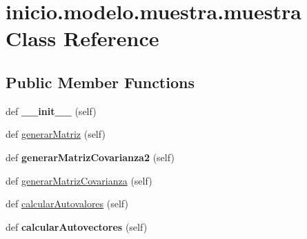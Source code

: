 \hypertarget{classinicio_1_1modelo_1_1muestra_1_1muestra}{}\section{inicio.\+modelo.\+muestra.\+muestra Class Reference}
\label{classinicio_1_1modelo_1_1muestra_1_1muestra}
\subsection*{Public Member Functions}
\begin{DoxyCompactItemize}
\item 
\mbox{\label{classinicio_1_1modelo_1_1muestra_1_1muestra_a402b8c8efcaea7d19d5d58b94e83dc6e}} 
def {\bfseries \+\_\+\+\_\+init\+\_\+\+\_\+} (self)
\item 
def \hyperlink{classinicio_1_1modelo_1_1muestra_1_1muestra_aa851f3e02e1b300574d4b4e6d56584e9}{generar\+Matriz} (self)
\item 
\mbox{\label{classinicio_1_1modelo_1_1muestra_1_1muestra_ae5af505ecfdd4abaea1e849fecf53aa2}} 
def {\bfseries generar\+Matriz\+Covarianza2} (self)
\item 
def \hyperlink{classinicio_1_1modelo_1_1muestra_1_1muestra_a395c113c5874b3f561737696d6658584}{generar\+Matriz\+Covarianza} (self)
\item 
def \hyperlink{classinicio_1_1modelo_1_1muestra_1_1muestra_aefb6a206689e6f0ff049028b68c5dc00}{calcular\+Autovalores} (self)
\item 
\mbox{\label{classinicio_1_1modelo_1_1muestra_1_1muestra_ae57339075e6fc9ede255048d4ab9f945}} 
def {\bfseries calcular\+Autovectores} (self)
\end{DoxyCompactItemize}
